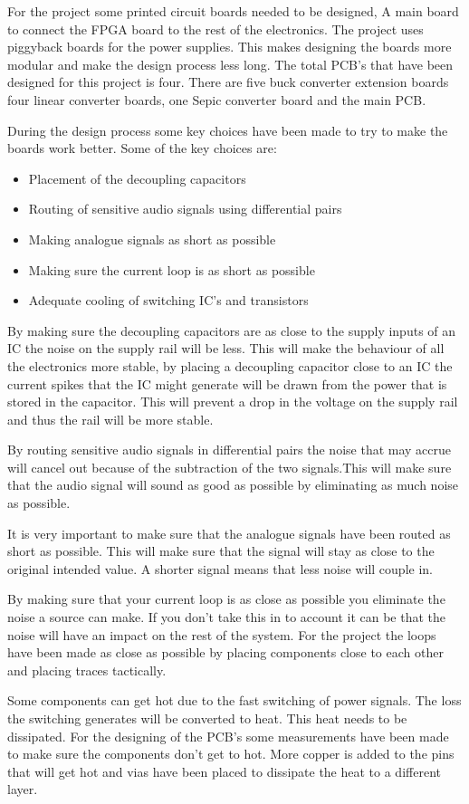 For the project some printed circuit boards needed to be designed, A main board to connect the FPGA board to the rest of the electronics. The project uses piggyback boards for the power supplies. This makes designing the boards more modular and make the design process less long. The total PCB’s that have been designed for this project is four. There are five buck converter extension boards four linear converter boards, one Sepic converter board and the main PCB. 
\par
\noindent During the design process some key choices have been made to try to make the boards work better. Some of the key choices are:
\begin{itemize}
    \setlength\itemsep{-0.3em} %
    \item Placement of the decoupling capacitors
    \item Routing of sensitive audio signals using differential pairs
    \item Making analogue signals as short as possible
    \item Making sure the current loop is as short as possible
    \item Adequate cooling of switching IC’s and transistors
\end{itemize}
\par
\noindent By making sure the decoupling capacitors are as close to the supply inputs of an IC the noise on the supply rail will be less. This will make the behaviour of all the electronics more stable, by placing a decoupling capacitor close to an IC the current spikes that the IC might generate will be drawn from the power that is stored in the capacitor. This will prevent a drop in the voltage on the supply rail and thus the rail will be more stable.
\par
\noindent By routing sensitive audio signals in differential pairs the noise that may accrue will cancel out because of the subtraction of the two signals.This will make sure that the audio signal will sound as good as possible by eliminating as much noise as possible.
\par
\noindent It is very important to make sure that the analogue signals have been routed as short as possible. This will make sure that the signal will stay as close to the original intended value. A shorter signal means that less noise will couple in.
\par
\noindent By making sure that your current loop is as close as possible you eliminate the noise a source can make. If you don’t take this in to account it can be that the noise will have an impact on the rest of the system. For the project the loops have been made as close as possible by placing components close to each other and placing traces tactically.
\par
\noindent Some components can get hot due to the fast switching of power signals. The loss the switching generates will be converted to heat. This heat needs to be dissipated. For the designing of the PCB’s some measurements have been made to make sure the components don’t get to hot. More copper is added to the pins that will get hot and vias have been placed to dissipate the heat to a different layer. 

\par
\noindent 